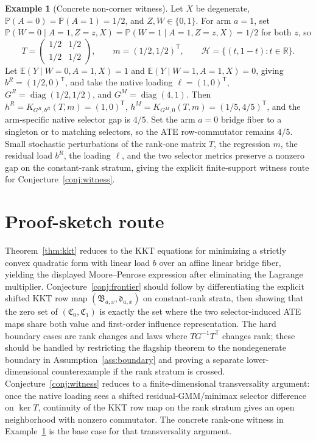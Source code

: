\documentclass[11pt]{article}
\newcommand{\E}{\mathbb{E}}
\renewcommand{\Pr}{\mathbb{P}}
\newcommand{\transpose}{\mathsf{T}}
\newcommand{\calH}{\mathcal{H}}
\newcommand{\R}{\mathbb{R}}
\theoremstyle{definition}
\newtheorem{example}{Example}
\theoremstyle{plain}
\theoremstyle{remark}
\begin{document}
\begin{example}[Concrete non-corner witness]\label{ex:witness}
Let \(X\) be degenerate, \(\Pr(A=0)=\Pr(A=1)=1/2\), and \(Z,W\in\{0,1\}\). For arm \(a=1\), set \(\Pr(W=0\mid A=1,Z=z,X)=\Pr(W=1\mid A=1,Z=z,X)=1/2\) for both \(z\), so
\[
T=\begin{pmatrix}1/2&1/2\\1/2&1/2\end{pmatrix},\qquad m=(1/2,1/2)^\transpose,\qquad \calH=\{(t,1-t):t\in\R\}.
\]
Let \(\E(Y\mid W=0,A=1,X)=1\) and \(\E(Y\mid W=1,A=1,X)=0\), giving \(b^R=(1/2,0)^\transpose\), and take the native loading \(\ell=(1,0)^\transpose\), \(G^R=\operatorname{diag}(1/2,1/2)\), and \(G^M=\operatorname{diag}(4,1)\). Then \(h^R=K_{G^R,b^R}(T,m)=(1,0)^\transpose\), \(h^M=K_{G^M,0}(T,m)=(1/5,4/5)^\transpose\), and the arm-specific native selector gap is \(4/5\). Set the arm \(a=0\) bridge fiber to a singleton or to matching selectors, so the ATE row-commutator remains \(4/5\). Small stochastic perturbations of the rank-one matrix \(T\), the regression \(m\), the residual load \(b^R\), the loading \(\ell\), and the two selector metrics preserve a nonzero gap on the constant-rank stratum, giving the explicit finite-support witness route for Conjecture~\ref{conj:witness}.
\end{example}

\section{Proof-sketch route}
Theorem~\ref{thm:kkt} reduces to the KKT equations for minimizing a strictly convex quadratic form with linear load \(b\) over an affine linear bridge fiber, yielding the displayed Moore--Penrose expression after eliminating the Lagrange multiplier. Conjecture~\ref{conj:frontier} should follow by differentiating the explicit shifted KKT row map \((\mathfrak B_{a,x},\mathfrak d_{a,x})\) on constant-rank strata, then showing that the zero set of \((\mathfrak C_0,\mathfrak C_1)\) is exactly the set where the two selector-induced ATE maps share both value and first-order influence representation. The hard boundary cases are rank changes and laws where \(TG^{-1}T^\transpose\) changes rank; these should be handled by restricting the flagship theorem to the nondegenerate boundary in Assumption~\ref{ass:boundary} and proving a separate lower-dimensional counterexample if the rank stratum is crossed. Conjecture~\ref{conj:witness} reduces to a finite-dimensional transversality argument: once the native loading sees a shifted residual-GMM/minimax selector difference on \(\ker T\), continuity of the KKT row map on the rank stratum gives an open neighborhood with nonzero commutator. The concrete rank-one witness in Example~\ref{ex:witness} is the base case for that transversality argument.
\end{document}
